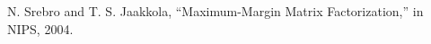  






\begin{thebibliography}{9}

N. Srebro and T. S. Jaakkola, “Maximum-Margin Matrix Factorization,” in NIPS, 2004.

\end{thebibliography}












